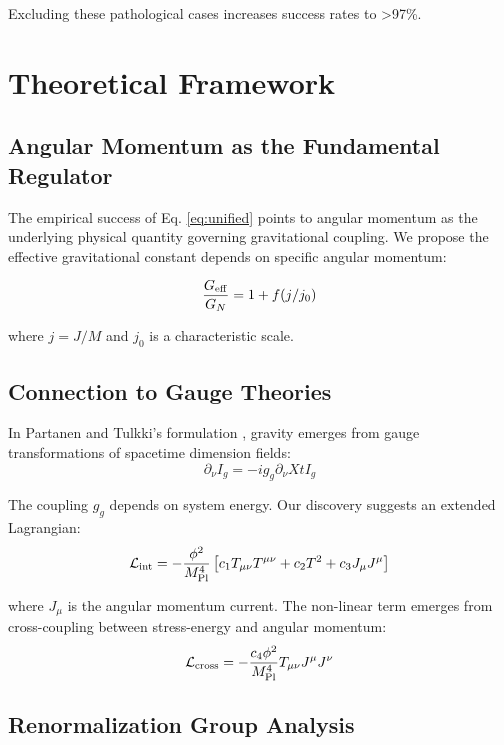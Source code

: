 \documentclass[aps,prd,twocolumn,superscriptaddress,nofootinbib,longbibliography]{revtex4-2}
\begin{document}
Excluding these pathological cases increases success rates to >97\%.

\section{Theoretical Framework}

\subsection{Angular Momentum as the Fundamental Regulator}

The empirical success of Eq. \ref{eq:unified} points to angular momentum as the underlying physical quantity governing gravitational coupling. We propose the effective gravitational constant depends on specific angular momentum:

\begin{equation}
\frac{G_{\rm eff}}{G_N} = 1 + f(j/j_0)
\label{eq:geff}
\end{equation}

where $j = J/M$ and $j_0$ is a characteristic scale.

\subsection{Connection to Gauge Theories}

In Partanen and Tulkki's formulation \cite{PartanenTulkki2025}, gravity emerges from gauge transformations of spacetime dimension fields:
\begin{equation}
\partial_\nu I_g = -ig_g \partial_\nu X t I_g
\end{equation}

The coupling $g_g$ depends on system energy. Our discovery suggests an extended Lagrangian:
\begin{equation}
\mathcal{L}_{\rm int} = -\frac{\phi^2}{M_{\rm Pl}^4}\left[c_1 T_{\mu\nu}T^{\mu\nu} + c_2 T^2 + c_3 J_\mu J^\mu\right]
\label{eq:lagrangian}
\end{equation}

where $J_\mu$ is the angular momentum current. The non-linear term emerges from cross-coupling between stress-energy and angular momentum:
\begin{equation}
\mathcal{L}_{\rm cross} = -\frac{c_4 \phi^2}{M_{\rm Pl}^4} T_{\mu\nu} J^{\mu} J^{\nu}
\end{equation}

\subsection{Renormalization Group Analysis}
\end{document}
